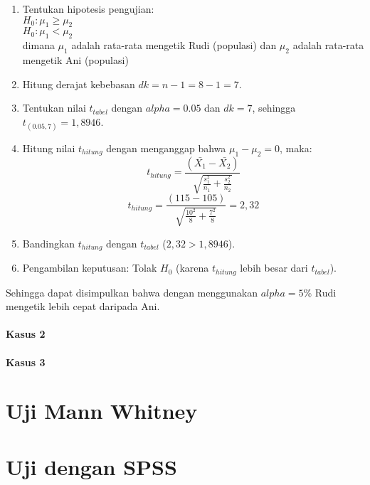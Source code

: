 \documentclass[
]{book}
\providecommand{\tightlist}{%
  \setlength{\itemsep}{0pt}\setlength{\parskip}{0pt}}
\begin{document}
\begin{enumerate}
\def\labelenumi{\arabic{enumi}.}
\tightlist
\item
  Tentukan hipotesis pengujian:\\
  \(H_0 : \mu_1 \geq \mu_2\)\\
  \(H_0 : \mu_1 < \mu_2\)\\
  dimana \(\mu_1\) adalah rata-rata mengetik Rudi (populasi) dan \(\mu_2\) adalah rata-rata mengetik Ani (populasi)
\item
  Hitung derajat kebebasan \(dk = n - 1 = 8 - 1 = 7\).
\item
  Tentukan nilai \(t_{tabel}\) dengan \(alpha=0.05\) dan \(dk = 7\), sehingga \(t_{(0.05,7)} = 1,8946\).
\item
  Hitung nilai \(t_{hitung}\) dengan menganggap bahwa \(\mu_1-\mu_2 = 0\), maka:\\
  \[
  t_{hitung} = \frac{(\bar{X_1}-\bar{X_2})}{\sqrt{\frac{s_1^2}{n_1}+\frac{s_2^2}{n_2}}}
  \]
  \[
  t_{hitung} = \frac{(115-105)}{\sqrt{\frac{10^2}{8}+\frac{7^2}{8}}} = 2,32
  \]
\item
  Bandingkan \(t_{hitung}\) dengan \(t_{tabel}\) (\(2,32 > 1,8946\)).
\item
  Pengambilan keputusan: Tolak \(H_0\) (karena \(t_{hitung}\) lebih besar dari \(t_{tabel}\)).
\end{enumerate}

Sehingga dapat disimpulkan bahwa dengan menggunakan \(alpha = 5\%\) Rudi mengetik lebih cepat daripada Ani.

\hypertarget{kasus-2}{%
\paragraph{Kasus 2}\label{kasus-2}}

\hypertarget{kasus-3}{%
\paragraph{Kasus 3}\label{kasus-3}}

\hypertarget{uji-mann-whitney}{%
\section{Uji Mann Whitney}\label{uji-mann-whitney}}

\hypertarget{uji-dengan-spss}{%
\section{Uji dengan SPSS}\label{uji-dengan-spss}}
\end{document}
